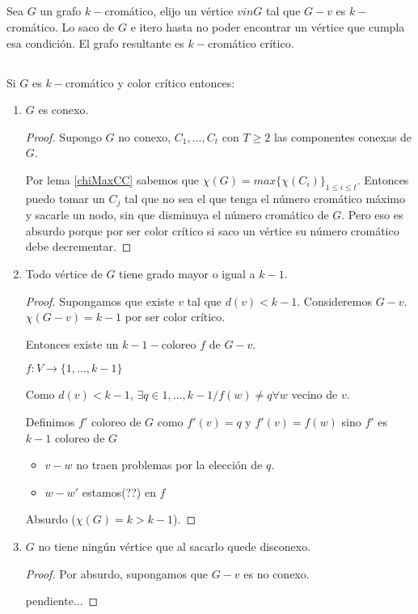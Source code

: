 \subsection{}
\setcounter{subsubsection}{1}
\subsubsection{}
Sea $G$ un grafo $k-$cromático, elijo un vértice $v in G$ tal que $G - v$ es $k-$cromático. Lo saco de $G$ e itero hasta no poder encontrar un vértice que cumpla esa condición. El grafo resultante es $k-$cromático crítico.

\subsection{}
Si $G$ es $k-$cromático y color crítico entonces:

\begin{enumerate}[label=\alph*)]
	\item {
		$G$ es conexo.

		\begin{proof}
			Supongo $G$ no conexo, $C_1, ..., C_t$ con $T \geq 2$ las componentes conexas de $G$. 

			Por lema \ref{chiMaxCC} sabemos que $\chi(G) = max \{\chi(C_i)\}_{1 \leq i \leq t}$. Entonces puedo tomar un $C_j$ tal que no sea el que tenga el número cromático máximo y sacarle un nodo, sin que disminuya el número cromático de $G$. Pero eso es absurdo porque por ser color crítico si saco un vértice su número cromático debe decrementar.
		\end{proof}
	}
	\item{
		Todo vértice de $G$ tiene grado mayor o igual a $k - 1$.

		\begin{proof}
			Supongamos que existe $v$ tal que $d(v) < k - 1$. Consideremos $G - v$. $\chi(G - v) = k - 1$ por ser color crítico.

			Entonces existe un $k-1-$coloreo $f$ de $G - v$.

			$f: V \longrightarrow \{1, ..., k - 1\}$

			Como $d(v) < k - 1$, $\exists q \in {1, ..., k - 1} / f(w) \not= q \forall w$ vecino de $v$.

			Definimos $f'$ coloreo de $G$ como $f'(v) = q$ y $f'(v) = f(w)$ sino $f'$ es $k - 1$ coloreo de $G$

			\begin{itemize}
				\item $v-w$ no traen problemas por la elección de $q$.
				\item $w-w'$ estamos(??) en $f$
			\end{itemize}

			Absurdo ($\chi(G) = k > k - 1$).
		\end{proof}
	}
	\item{
		$G$ no tiene ningún vértice que al sacarlo quede disconexo.

		\begin{proof}
			Por absurdo, supongamos que $G - v$ es no conexo.

			pendiente...
		\end{proof}
	}
\end{enumerate}

